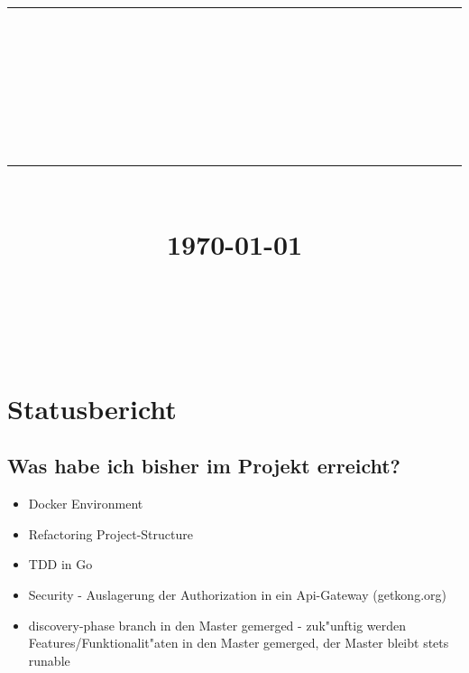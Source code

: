 \documentclass[12pt]{article}
\newcommand{\HRule}[1]{\rule{\linewidth}{#1}}
\begin{document}
\title{ \normalsize
		\HRule{0.5pt} \\
		\LARGE \textbf{\uppercase{\newCommandDiscipline}} \\
    \smallbreak
		\small\textbf{{\newCommandTerm}}\\
		\HRule{2pt} \\ [0.5cm]
		\normalsize \today \vspace*{10\baselineskip}}

\date{}

\author{
		\newCommandName \\
		\newCommandMatriculationNumber \\
		\newCommandUniversity \\
		\newCommandFaculty
}


\maketitle

\newpage



\sectionfont{\scshape}


\section{Statusbericht}
\subsection{Was habe ich bisher im Projekt erreicht?}
\begin{itemize}
\item Docker Environment
\item Refactoring Project-Structure
\item TDD in Go
\item Security - Auslagerung der Authorization in ein Api-Gateway (getkong.org)
\item discovery-phase branch in den Master gemerged - zuk"unftig werden Features/Funktionalit"aten in den Master gemerged, der Master bleibt stets runable
\end{itemize}
\end{document}
